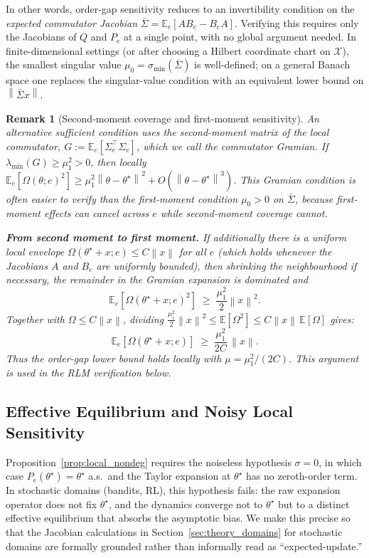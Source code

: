 \documentclass[12pt,a4paper]{article}
\newtheorem{remark}[definition]{Remark}
\newcommand{\X}{\mathcal{X}}
\newcommand{\norm}[1]{\left\lVert#1\right\rVert}
\newcommand{\Ogap}{\Omega}
\begin{document}
In other words, order-gap sensitivity reduces to an invertibility condition on
the \emph{expected commutator Jacobian} $\bar\Sigma = \mathbb{E}_e[A B_e - B_e A]$.
Verifying this requires only the Jacobians of $Q$ and $P_e$ at a single point,
with no global argument needed. In finite-dimensional settings (or after
choosing a Hilbert coordinate chart on $\X$), the smallest singular value
$\mu_0 = \sigma_{\min}(\bar\Sigma)$ is well-defined; on a general Banach
space one replaces the singular-value condition with an equivalent lower bound
on $\norm{\bar\Sigma x}$.

\begin{remark}[Second-moment coverage and first-moment sensitivity]
\label{rem:second_moment}
An alternative sufficient condition uses the second-moment matrix of the local
commutator, $G := \mathbb{E}_e[\Sigma_e^\top \Sigma_e]$, which we call the
\emph{commutator Gramian}. If
$\lambda_{\min}(G) \geq \mu_1^2 > 0$, then locally
$\mathbb{E}_e[\Ogap(\theta; e)^2] \geq \mu_1^2 \norm{\theta -
\theta^\star}^2 + O(\norm{\theta - \theta^\star}^3)$. This Gramian condition
is often easier to verify than the first-moment condition $\mu_0 > 0$ on
$\bar\Sigma$, because first-moment effects can cancel across $e$ while
second-moment coverage cannot.

\textbf{From second moment to first moment.} If additionally there is a uniform local envelope
$\Ogap(\theta^\star + x; e) \leq C\norm{x}$ for all $e$ (which holds whenever
the Jacobians $A$ and $B_e$ are uniformly bounded), then shrinking the
neighbourhood if necessary, the remainder in the Gramian expansion is
dominated and
\[
  \mathbb{E}_e[\Ogap(\theta^\star + x; e)^2]
  \;\geq\; \frac{\mu_1^2}{2}\norm{x}^2.
\]
Together with $\Ogap \leq C\norm{x}$, dividing
$\tfrac{\mu_1^2}{2}\norm{x}^2 \leq \mathbb{E}[\Ogap^2] \leq
C\norm{x}\,\mathbb{E}[\Ogap]$ gives:
\[
  \mathbb{E}_e[\Ogap(\theta^\star + x; e)]
  \;\geq\; \frac{\mu_1^2}{2C}\,\norm{x}.
\]
Thus the order-gap lower bound holds locally with $\mu = \mu_1^2/(2C)$. This argument is used
in the RLM verification below.
\end{remark}

\subsection{Effective Equilibrium and Noisy Local Sensitivity}
\label{sec:effective_equilibrium}

Proposition~\ref{prop:local_nondeg} requires the noiseless hypothesis
$\sigma = 0$, in which case $P_e(\theta^\star) = \theta^\star$ a.s.\ and the
Taylor expansion at $\theta^\star$ has no zeroth-order term. In stochastic
domains (bandits, RL), this hypothesis fails: the raw expansion
operator does not fix $\theta^\star$, and the dynamics converge not to
$\theta^\star$ but to a distinct effective equilibrium that absorbs the
asymptotic bias. We make this precise so that the Jacobian calculations in
Section~\ref{sec:theory_domains} for stochastic domains are formally
grounded rather than informally read as ``expected-update.''
\end{document}
